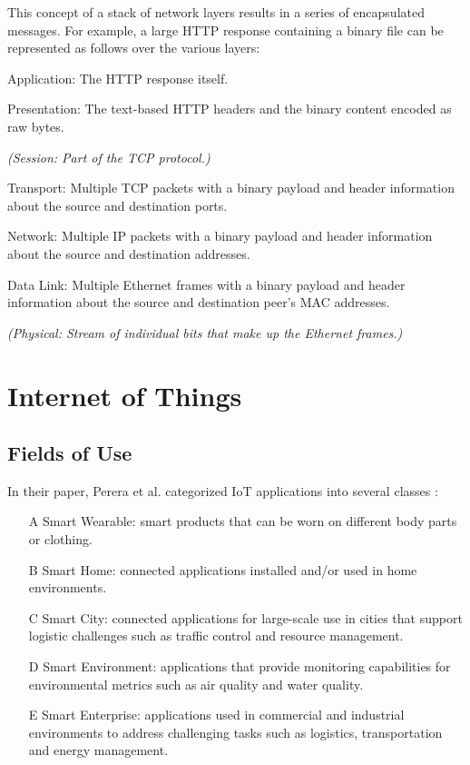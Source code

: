 This concept of a stack of network layers results in a series of encapsulated messages. For example, a large \ac{HTTP} response containing a binary file can be represented as follows over the various layers:
\begin{etaremune}
    \item Application: The \ac{HTTP} response itself.
    \item Presentation: The text-based \ac{HTTP} headers and the binary content encoded as raw bytes.
    \item \textit{(Session: Part of the \ac{TCP} protocol.)}
    \item Transport: Multiple \ac{TCP} packets with a binary payload and header information about the source and destination ports.
    \item Network: Multiple \ac{IP} packets with a binary payload and header information about the source and destination addresses.
    \item Data Link: Multiple Ethernet frames with a binary payload and header information about the source and destination peer's \ac{MAC} addresses.
    \item \textit{(Physical: Stream of individual bits that make up the Ethernet frames.)}
\end{etaremune}


\section{Internet of Things}
\label{sec:internet-of-things}
\subsection{Fields of Use}
In their paper, Perera et al. categorized \ac{IoT} applications into several classes \cite{IOTSurvey}:
\begin{itemize}
    \item[A]{Smart Wearable: smart products that can be worn on different body parts or clothing.}
    \item[B]{Smart Home: connected applications installed and/or used in home environments.}
    \item[C]{Smart City: connected applications for large-scale use in cities that support logistic challenges such as traffic control and resource management.}
    \item[D]{Smart Environment: applications that provide monitoring capabilities for environmental metrics such as air quality and water quality.}
    \item[E]{Smart Enterprise: applications used in commercial and industrial environments to address challenging tasks such as logistics, transportation and energy management.}
\end{itemize}

